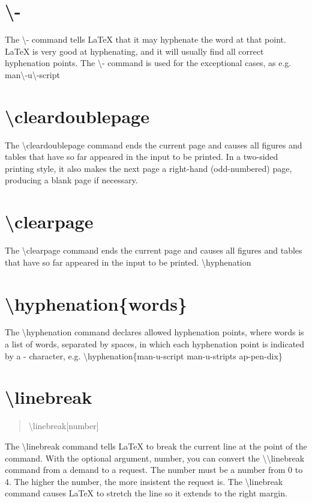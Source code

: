 \documentclass[letterpaper,twocolumn]{article}
\begin{document}
\section{\textbackslash -}

The \textbackslash - command tells LaTeX that it may hyphenate the word at that point. LaTeX is very good at hyphenating, and it will usually find all correct hyphenation points. The \textbackslash - command is used for the exceptional cases, as e.g.
 man\textbackslash-u\textbackslash-script
\section{\textbackslash cleardoublepage
}
The \textbackslash cleardoublepage command ends the current page and causes all figures and tables that have so far appeared in the input to be printed. In a two-sided printing style, it also makes the next page a right-hand (odd-numbered) page, producing a blank page if necessary.
\section{\textbackslash clearpage}

The \textbackslash clearpage command ends the current page and causes all figures and tables that have so far appeared in the input to be printed.
\textbackslash hyphenation

\section{\textbackslash hyphenation\{words\}}
The \textbackslash hyphenation command declares allowed hyphenation points, where words is a list of words, separated by spaces, in which each hyphenation point is indicated by a - character, e.g.
  \textbackslash hyphenation\{man-u-script man-u-stripts ap-pen-dix\}
\section{\textbackslash linebreak}
\begin{quote}
\textbackslash linebreak[number]
\end{quote}
The \textbackslash linebreak command tells LaTeX to break the current line at the point of the command. With the optional argument, number, you can convert the \textbackslash \textbackslash linebreak command from a demand to a request. The number must be a number from 0 to 4. The higher the number, the more insistent the request is.
The \textbackslash linebreak command causes LaTeX to stretch the line so it extends to the right margin.
\end{document}
